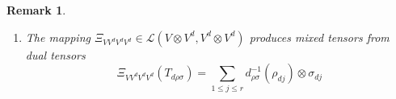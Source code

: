 \documentclass[aps,preprint]{revtex4}
\newtheorem{remark}[theorem]{Remark}
\begin{document}
\begin{remark}
\begin{enumerate}
\begin{enumerate}
\item 
\begin{gather}
T_{d\rho \sigma } \\
\parallel \\
\left( 
\begin{array}{ccc}
e_{d1}\otimes f_{d1} & \cdots & e_{dr}\otimes f_{dr}%
\end{array}%
\right) \left( 
\begin{array}{c}
\mathcal{R}_{e_{d}\otimes f_{d}}\left( T_{d\rho \sigma }\right) _{11} \\ 
\vdots \\ 
\mathcal{R}_{e_{d}\otimes f_{d}}\left( T_{d\rho \sigma }\right) _{rr}%
\end{array}%
\right) \\
\parallel \\
\sum_{1\leq j\leq r}\left\{ \left( 
\begin{array}{ccc}
e_{d1}\otimes f_{d1} & \cdots & e_{dr}\otimes f_{dr}%
\end{array}%
\right) \left( 
\begin{array}{c}
\mathcal{R}_{e_{d}}\left( \rho _{dj}\right) _{1}\mathcal{R}_{f_{d}}\left(
\sigma _{dj}\right) _{1} \\ 
\vdots \\ 
\mathcal{R}_{e_{d}}\left( \rho _{dj}\right) _{r}\mathcal{R}_{f_{d}}\left(
\sigma _{dj}\right) _{r}%
\end{array}%
\right) \right\} =\left( 
\begin{array}{ccc}
e_{d1}\otimes f_{d1} & \cdots & e_{dr}\otimes f_{dr}%
\end{array}%
\right) \left( \sum_{1\leq j\leq r}\left\{ \left( 
\begin{array}{c}
\mathcal{R}_{e_{d}}\left( \rho _{dj}\right) _{1} \\ 
\vdots \\ 
\mathcal{R}_{e_{d}}\left( \rho _{dj}\right) _{r}%
\end{array}%
\right) \otimes \left( 
\begin{array}{c}
\mathcal{R}_{f_{d}}\left( \sigma _{dj}\right) _{1} \\ 
\vdots \\ 
\mathcal{R}_{f_{d}}\left( \sigma _{dj}\right) _{r}%
\end{array}%
\right) \right\} \right)
\end{gather}
\end{enumerate}

\item The mapping $\Xi _{VV^{d}V^{d}V^{d}}\in \mathcal{L}\left( V\otimes
V^{d},V^{d}\otimes V^{d}\right) $ produces mixed tensors from dual tensors 
\begin{equation}
\Xi _{VV^{d}V^{d}V^{d}}\left( T_{d\rho \sigma }\right) =\sum_{1\leq j\leq
r}d_{\rho \sigma }^{-1}\left( \rho _{dj}\right) \otimes \sigma _{dj}
\end{equation}


\end{enumerate}
\end{remark}
\end{document}

